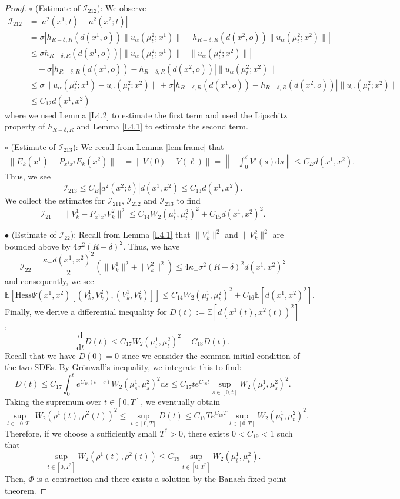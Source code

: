 \documentclass[11pt]{amsart}
\newcommand{\kp}{\kappa}
\newcommand{\bE}{\mathbb{E}}
\def\d{\mathrm{d}}
\newcommand{\p}{o}%
\newcommand{\dist}{d}%
\begin{document}
\begin{proof}
$\circ$ (Estimate of $\mathcal I_{212}$): We observe
\begin{align*}
\mathcal I_{212}&= |a^2(x^1;t)-a^2(x^2;t)|\\
&=\sigma|h_{R-\delta, R}(\dist(x^1, \p))\|u_\alpha(\mu_t^2;x^1)\|-h_{R-\delta, R}(\dist(x^2,\p))\|u_\alpha(\mu_t^2;x^2)\||\\
&\leq\sigma h_{R-\delta, R}(\dist(x^1,\p))\left|\|u_\alpha(\mu_t^2;x^1)\|-\|u_\alpha(\mu_t^2;x^2)\|\right| \\
&\quad +\sigma|h_{R-\delta, R}(\dist(x^1, \p))-h_{R-\delta, R}(\dist(x^2,\p))|\|u_\alpha(\mu_t^2;x^2)\|\\
&\leq\sigma\|u_\alpha(\mu_t^2;x^1)-u_\alpha(\mu_t^2;x^2)\|+\sigma|h_{R-\delta, R}(\dist(x^1, \p))-h_{R-\delta, R}(\dist(x^2,\p))|\|u_\alpha(\mu_t^2;x^2)\|\\
&\leq C_{12}\dist(x^1, x^2)
\end{align*}
where we used Lemma \ref{L4.2} to estimate the first term and used the Lipschitz property of $h_{R-\delta,R}$ and Lemma \ref{L4.1} to estimate the second term. 

$\circ$ (Estimate of $\mathcal I_{213}$): We recall from Lemma \ref{lem:frame} that 
\begin{align*} 
\| E_k(x^1) - P_{x^1x^2} E_k(x^2) \| &= \|V(0) - V(\ell)\|  = \left\| -\int_0^\ell V'(s) \d s\right\| \leq C_{E} d(x^1,x^2).
\end{align*}
Thus, we see
\[
\mathcal I_{213} \leq C_E |a^2(x^2;t)| d(x^1,x^2) \leq C_{13} d(x^1,x^2).
\]
We collect the estimates for $\mathcal I_{211}$, $\mathcal I_{212}$ and $\mathcal I_{213}$ to find
\[
\mathcal I_{21} = \|V_k^1-P_{x^1x^2}V_k^2\|^2 \leq  C_{14}W_2(\mu_t^1,\mu_t^2)^2+C_{15}\dist(x^1, x^2)^2.
\]

\noindent $\bullet$ (Estimate of $\mathcal I_{22}$): Recall from Lemma \ref{L4.1} that  $\|V_k^1\|^2$ and $\|V_k^2\|^2$ are bounded above by $4\sigma^2(R+\delta)^2$. Thus, we have
\[
\mathcal I_{22} = \frac{\kp_-d(x^1,x^2)^2}{2} (\|V_k^1\|^2 + \|V_k^2\|^2) \leq 4\kp_- \sigma^2(R+\delta)^2 d(x^1,x^2)^2
\]
and consequently, we see
\[
\bE\left[\mathrm{Hess}\Psi(x^1, x^2)[(V_k^1, V_k^2), (V_k^1, V_k^2)]\right]\leq C_{14}W_2(\mu_t^1,\mu_t^2)^2+C_{16}\bE[\dist(x^1, x^2)^2].
\]
Finally, we derive a differential inequality for $D(t):=\bE[\dist(x^1(t), x^2(t))^2]$:
\[
\frac{\d}{\d t}D(t)\leq C_{17}W_2(\mu_t^1,\mu_t^2)^2+C_{18}D(t).
\]
Recall that we have $D(0)=0$ since we consider the common initial condition of the two SDEs. 
By Grönwall's inequality, we integrate this to find:
\[
D(t) \leq C_{17} \int_0^t e^{C_{18}(t-s)} W_2(\mu_s^1,\mu_s^2)^2 \d s \leq C_{17} t e^{C_{18}t} \sup_{s\in [0,t]} W_2(\mu_s^1,\mu_s^2)^2.
\]
Taking the supremum over $t \in [0, T]$, we eventually obtain 
\[
\sup_{t \in [0,T]} W_2(\rho^1(t), \rho^2(t))^2\leq \sup_{t \in [0,T]} D(t)\leq C_{17} T e^{C_{18}T} \sup_{t \in [0,T]} W_2(\mu_t^1,\mu_t^2)^2.
\]
Therefore, if we choose a sufficiently small $T^*>0$, there exists $0<C_{19}<1$ such that
\[
\sup_{t \in [0,T^*]} W_2(\rho^1(t), \rho^2(t)) \leq C_{19} \sup_{t \in [0,T^*]} W_2(\mu^1_t,\mu_t^2).
\]
Then, $\Phi$ is a contraction and there exists a solution by the Banach fixed point theorem.


\end{proof}
\end{document}
